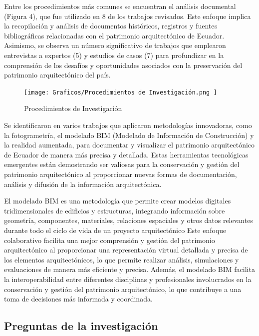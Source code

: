 \documentclass[journal,article,submit,pdftex,moreauthors]{Definitions/mdpi}
\begin{document}
Entre los procedimientos más comunes se encuentran el análisis documental (Figura 4), que fue utilizado en 8 de los trabajos revisados. Este enfoque implica la recopilación y análisis de documentos históricos, registros y fuentes bibliográficas relacionadas con el patrimonio arquitectónico de Ecuador. Asimismo, se observa un número significativo de trabajos que emplearon entrevistas a expertos (5) y estudios de casos (7) para profundizar en la comprensión de los desafíos y oportunidades asociados con la preservación del patrimonio arquitectónico del país.
 
\par %
  \begin{figure} [h!]
    \centering
    \texttt{[image: Graficos/Procedimientos de Investigación.png ]}
    \caption{Procedimientos de Investigación}
    \label{fig:grafico}
\end{figure}
\par %
Se identificaron en varios trabajos que aplicaron metodologías innovadoras, como la fotogrametría, el modelado BIM (Modelado de Información de Construcción) y la realidad aumentada, para documentar y visualizar el patrimonio arquitectónico de Ecuador de manera más precisa y detallada. Estas herramientas tecnológicas emergentes están demostrando ser valiosas para la conservación y gestión del patrimonio arquitectónico al proporcionar nuevas formas de documentación, análisis y difusión de la información arquitectónica.

El modelado BIM es una metodología que permite crear modelos digitales tridimensionales de edificios y estructuras, integrando información sobre geometría, componentes, materiales, relaciones espaciales y otros datos relevantes durante todo el ciclo de vida de un proyecto arquitectónico\cite{art:articulo10} Este enfoque colaborativo facilita una mejor comprensión y gestión del patrimonio arquitectónico al proporcionar una representación virtual detallada y precisa de los elementos arquitectónicos, lo que permite realizar análisis, simulaciones y evaluaciones de manera más eficiente y precisa. Además, el modelado BIM facilita la interoperabilidad entre diferentes disciplinas y profesionales involucrados en la conservación y gestión del patrimonio arquitectónico, lo que contribuye a una toma de decisiones más informada y coordinada.
\par %
 \subsection{\textbf{Preguntas de la investigación}}  
\end{document}
